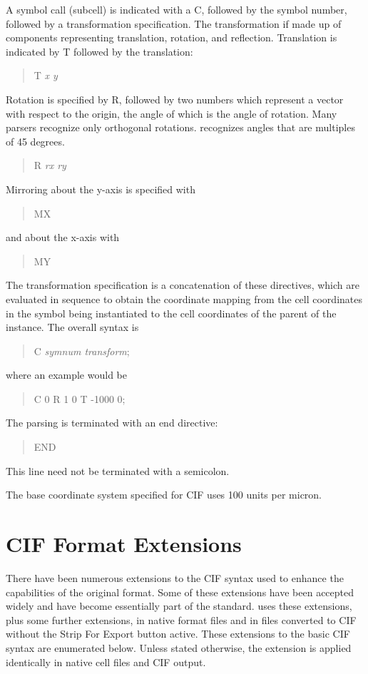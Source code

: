 A symbol call (subcell) is indicated with a {\vt C}, followed by the symbol
number, followed by a transformation specification.  The transformation
if made up of components representing translation, rotation, and
reflection.  Translation is indicated by {\vt T} followed by the translation:
\begin{quote}
T {\it x y}
\end{quote}
Rotation is specified by {\vt R}, followed by two numbers which represent
a vector with respect to the origin, the angle of which is the angle of
rotation.  Many parsers recognize only orthogonal rotations.  {\Xic}
recognizes angles that are multiples of 45 degrees.
\begin{quote}
R {\it rx ry}
\end{quote}
Mirroring about the y-axis is specified with
\begin{quote}
MX
\end{quote}
and about the x-axis with
\begin{quote}
MY
\end{quote}
The transformation specification is a concatenation of these directives,
which are evaluated in sequence to obtain the coordinate mapping from the
cell coordinates in the symbol being instantiated to the cell coordinates
of the parent of the instance.  The overall syntax is
\begin{quote}\vt
C {\it symnum transform\/};
\end{quote}
where an example would be
\begin{quote}\vt
C 0 R 1 0 T -1000 0;
\end{quote}

The parsing is terminated with an end directive:
\begin{quote}\vt
END
\end{quote}
This line need not be terminated with a semicolon.

The base coordinate system specified for CIF uses 100 units per micron.

\section{CIF Format Extensions}
\label{cifext}

There have been numerous extensions to the CIF syntax used to enhance
the capabilities of the original format.  Some of these extensions
have been accepted widely and have become essentially part of the
standard.  {\Xic} uses these extensions, plus some further extensions,
in native format files and in files converted to CIF without the {\cb
Strip For Export} button active.  These extensions to the basic CIF
syntax are enumerated below.  Unless stated otherwise, the extension
is applied identically in native cell files and CIF output.

